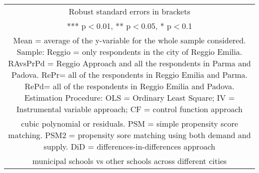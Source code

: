 \documentclass[]{article}
\begin{document}
\begin{tabular}{lcccccccccc}
\multicolumn{11}{c}{ Robust standard errors in brackets} \\
\multicolumn{11}{c}{ *** p$<$0.01, ** p$<$0.05, * p$<$0.1} \\
\multicolumn{11}{c}{ Mean = average of the y-variable for the whole sample considered. Sample: Reggio = only respondents in the city of Reggio Emilia. RAvsPrPd = Reggio Approach and all the respondents in Parma and Padova. RePr= all of the respondents in Reggio Emilia and Parma. RePd= all of the respondents in Reggio Emilia and Padova. Estimation Procedure: OLS = Ordinary Least Square; IV = Instrumental variable approach; CF = control function approach} \\
\multicolumn{11}{c}{ cubic polynomial or residuals. PSM = simple propensity score matching. PSM2 = propensity sore matching using both demand and supply. DiD = differences-in-differences approach} \\
\multicolumn{11}{c}{ municipal schools vs other schools across different cities} \\
\end{tabular}
\end{document}
